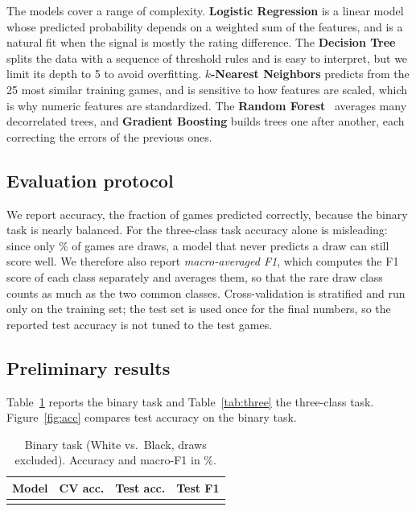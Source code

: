 \documentclass[sigconf]{acmart}
\begin{document}
The models cover a range of complexity. \textbf{Logistic Regression} is a linear model whose predicted probability depends on a weighted sum of the features, and is a natural fit when the signal is mostly the rating difference. The \textbf{Decision Tree} splits the data with a sequence of threshold rules and is easy to interpret, but we limit its depth to 5 to avoid overfitting. \textbf{$k$-Nearest Neighbors} predicts from the 25 most similar training games, and is sensitive to how features are scaled, which is why numeric features are standardized. The \textbf{Random Forest}~\cite{breiman} averages many decorrelated trees, and \textbf{Gradient Boosting} builds trees one after another, each correcting the errors of the previous ones.

\subsection{Evaluation protocol}
We report accuracy, the fraction of games predicted correctly, because the binary task is nearly balanced. For the three-class task accuracy alone is misleading: since only \pDraw\% of games are draws, a model that never predicts a draw can still score well. We therefore also report \emph{macro-averaged F1}, which computes the F1 score of each class separately and averages them, so that the rare draw class counts as much as the two common classes. Cross-validation is stratified and run only on the training set; the test set is used once for the final numbers, so the reported test accuracy is not tuned to the test games.

\subsection{Preliminary results}
Table~\ref{tab:binary} reports the binary task and Table~\ref{tab:three} the three-class task. Figure~\ref{fig:acc} compares test accuracy on the binary task.

\begin{table}[t]
  \caption{Binary task (White vs.\ Black, draws excluded). Accuracy and macro-F1 in \%.}
  \label{tab:binary}
  \footnotesize
  \begin{tabular}{@{}p{1.35in}ccc@{}}
    \toprule
    Model & CV acc. & Test acc. & Test F1 \\
    \midrule
    \\
    \bottomrule
  \end{tabular}
\end{table}
\end{document}
